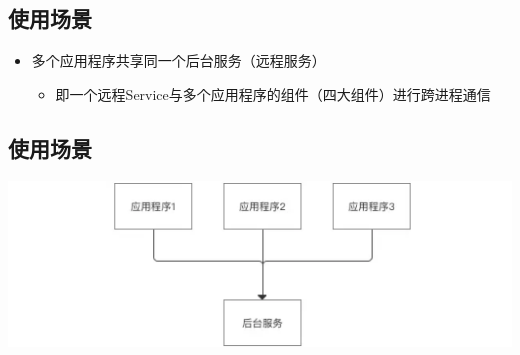 \documentclass[9pt, b5paper]{article}
\begin{document}
\subsection{使用场景}
\label{sec-5-3}
\begin{itemize}
\item 多个应用程序共享同一个后台服务（远程服务）
\begin{itemize}
\item 即一个远程Service与多个应用程序的组件（四大组件）进行跨进程通信
\end{itemize}
\end{itemize}
\subsection{使用场景}
\label{sec-5-4}

\includegraphics[width=.9\linewidth]{./pic/remoteService.png}
\end{document}
